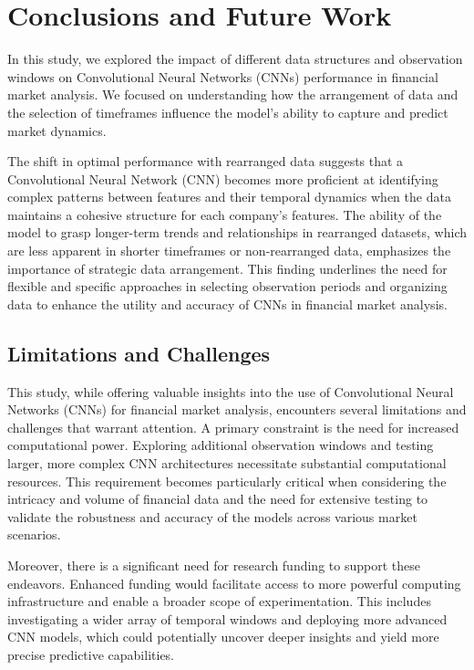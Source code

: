 \section{Conclusions and Future Work}

In this study, we explored the impact of different data structures and observation windows on Convolutional Neural Networks (CNNs) performance in financial market analysis. We focused on understanding how the arrangement of data and the selection of timeframes influence the model's ability to capture and predict market dynamics.

The shift in optimal performance with rearranged data suggests that a Convolutional Neural Network (CNN) becomes more proficient at identifying complex patterns between features and their temporal dynamics when the data maintains a cohesive structure for each company's features. The ability of the model to grasp longer-term trends and relationships in rearranged datasets, which are less apparent in shorter timeframes or non-rearranged data, emphasizes the importance of strategic data arrangement. This finding underlines the need for flexible and specific approaches in selecting observation periods and organizing data to enhance the utility and accuracy of CNNs in financial market analysis.

\subsection{Limitations and Challenges}

This study, while offering valuable insights into the use of Convolutional Neural Networks (CNNs) for financial market analysis, encounters several limitations and challenges that warrant attention. A primary constraint is the need for increased computational power. Exploring additional observation windows and testing larger, more complex CNN architectures necessitate substantial computational resources. This requirement becomes particularly critical when considering the intricacy and volume of financial data and the need for extensive testing to validate the robustness and accuracy of the models across various market scenarios.

Moreover, there is a significant need for research funding to support these endeavors. Enhanced funding would facilitate access to more powerful computing infrastructure and enable a broader scope of experimentation. This includes investigating a wider array of temporal windows and deploying more advanced CNN models, which could potentially uncover deeper insights and yield more precise predictive capabilities.

